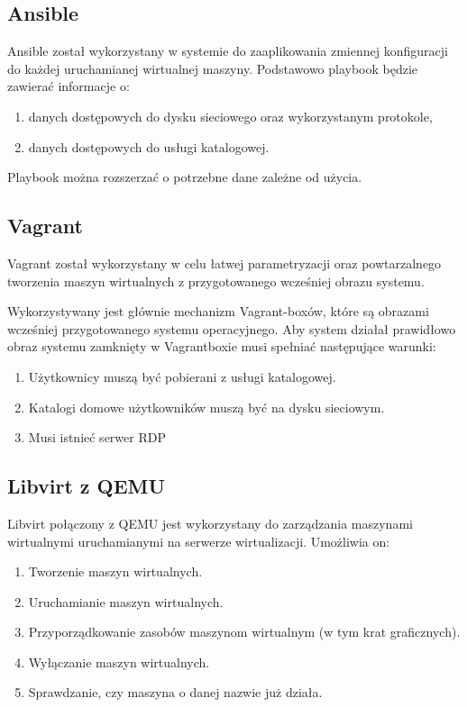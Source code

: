 \documentclass[../opis-rozwiazania.tex]{subfiles}
\begin{document}
\subsection{Ansible}
Ansible został wykorzystany w systemie do zaaplikowania zmiennej konfiguracji do każdej uruchamianej wirtualnej maszyny.
Podstawowo playbook będzie zawierać informacje o:
\begin{enumerate}
    \item danych dostępowych do dysku sieciowego oraz wykorzystanym protokole,
    \item danych dostępowych do usługi katalogowej.
\end{enumerate}
Playbook można rozszerzać o potrzebne dane zależne od użycia.

\subsection{Vagrant}
Vagrant został wykorzystany w celu łatwej parametryzacji oraz powtarzalnego tworzenia maszyn wirtualnych z przygotowanego wcześniej obrazu systemu.

Wykorzystywany jest głównie mechanizm Vagrant-boxów, które są obrazami wcześniej przygotowanego systemu operacyjnego.
Aby system działał prawidłowo obraz systemu zamknięty w Vagrantboxie musi spełniać następujące warunki:
\begin{enumerate}
    \item Użytkownicy muszą być pobierani z usługi katalogowej.
    \item Katalogi domowe użytkowników muszą być na dysku sieciowym.
    \item Musi istnieć serwer RDP
\end{enumerate}

\subsection{Libvirt z QEMU}
Libvirt połączony z QEMU jest wykorzystany do zarządzania maszynami wirtualnymi uruchamianymi na serwerze wirtualizacji.
Umożliwia on:
\begin{enumerate}
    \item Tworzenie maszyn wirtualnych.
    \item Uruchamianie maszyn wirtualnych.
    \item Przyporządkowanie zasobów maszynom wirtualnym (w tym krat graficznych).
    \item Wyłączanie maszyn wirtualnych.
    \item Sprawdzanie, czy maszyna o danej nazwie już działa.
\end{enumerate}
\end{document}
